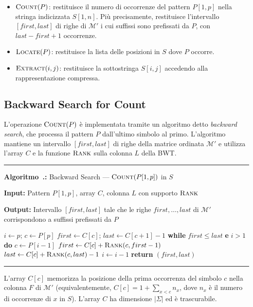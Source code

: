 \documentclass[12pt, a4paper, oneside]{book}
\newcounter{algocf}[chapter]
\renewcommand{\thealgocf}{\thechapter.\arabic{algocf}}
\newenvironment{algorithm}[1][H]{%
  \refstepcounter{algocf}%
  \par\medskip\noindent\rule{\linewidth}{0.4pt}\par\smallskip
}{%
  \par\smallskip\noindent\rule{\linewidth}{0.4pt}\par\medskip
}
\newcommand{\algcaption}[1]{\noindent\textbf{Algoritmo~\thealgocf:} #1\par\smallskip}
\newcommand{\KwIn}[1]{\noindent\textbf{Input:} #1\par}
\newcommand{\KwOut}[1]{\noindent\textbf{Output:} #1\par}
\newcommand{\BlankLine}{\par\smallskip}
\newcommand{\While}[1]{\noindent\textbf{while} #1 \textbf{do}}
\newcommand{\Return}[1]{\noindent\textbf{return} #1}
\theoremstyle{plain}
\theoremstyle{definition}
\theoremstyle{remark}
\begin{document}
\begin{itemize}
  \item $\textsc{Count}(P)$: restituisce il numero di occorrenze del pattern $P[1,p]$ nella stringa indicizzata $S[1,n]$. Più precisamente, restituisce l'intervallo $[first, last]$ di righe di $\mathcal{M}'$ i cui suffissi sono prefissati da $P$, con $last - first + 1$ occorrenze.
  \item $\textsc{Locate}(P)$: restituisce la lista delle posizioni in $S$ dove $P$ occorre.
  \item $\textsc{Extract}(i, j)$: restituisce la sottostringa $S[i, j]$ accedendo alla rappresentazione compressa.
\end{itemize}

\subsection{Backward Search for Count}
\label{subsec:backward-search}

L'operazione $\textsc{Count}(P)$ è implementata tramite un algoritmo detto \emph{backward search}, che processa il pattern $P$ dall'ultimo simbolo al primo. L'algoritmo mantiene un intervallo $[first, last]$ di righe della matrice ordinata $\mathcal{M}'$ e utilizza l'array $C$ e la funzione $\textsc{Rank}$ sulla colonna $L$ della BWT.

\begin{algorithm}[H]
\algcaption{Backward Search --- $\textsc{Count}(P[1,p])$ in $S$}
\label{alg:backward-search}
\KwIn{Pattern $P[1,p]$, array $C$, colonna $L$ con supporto $\textsc{Rank}$}
\KwOut{Intervallo $[first, last]$ tale che le righe $first, \ldots, last$ di $\mathcal{M}'$ corrispondono a suffissi prefissati da $P$}
\BlankLine
$i \gets p$; $c \gets P[p]$\;
$first \gets C[c]$; $last \gets C[c+1] - 1$\;
\While{$first \le last$ \textbf{e} $i > 1$}{
  $c \gets P[i-1]$\;
  $first \gets C[c] + \textsc{Rank}(c, first - 1)$\;
  $last \gets C[c] + \textsc{Rank}(c, last) - 1$\;
  $i \gets i - 1$\;
}
\Return{$(first, last)$}\;
\end{algorithm}

L'array $C[c]$ memorizza la posizione della prima occorrenza del simbolo $c$ nella colonna $F$ di $\mathcal{M}'$ (equivalentemente, $C[c] = 1 + \sum_{x < c} n_x$, dove $n_x$ è il numero di occorrenze di $x$ in $S$). L'array $C$ ha dimensione $|\Sigma|$ ed è trascurabile.
\end{document}
